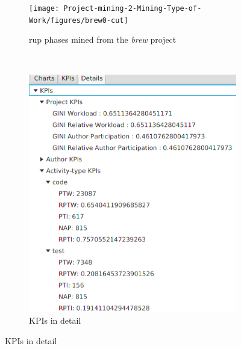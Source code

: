 \begin{figure}[]
\centering
\begin{subfigure}[b]{0.7\textwidth}
    \centering
    \texttt{[image: Project-mining-2-Mining-Type-of-Work/figures/brew0-cut]}
    \caption{\gls{rup} phases mined from the \textsl{brew} project}
    \label{fig:rup-phases}
\end{subfigure}~
\begin{subfigure}[b]{0.3\textwidth}
    \centering
    \includegraphics[width=\textwidth]{Project-mining-2-Mining-Type-of-Work/figures/brew3-cut}
    \caption{KPIs in detail}
    \label{fig:brew3}
\end{subfigure}


\end{figure}
